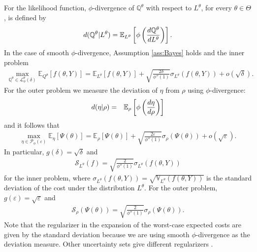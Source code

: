 \documentclass[10pt,a4paper]{amsart}
\numberwithin{equation}{section}
\numberwithin{theorem}{section}
\numberwithin{table}{section}
\numberwithin{figure}{section}
\begin{document}
For the likelihood function,  $\phi$-divergence of ${\mathbb Q}^\theta$ with respect to $L^\theta$, for every $\theta\in{\Theta}$, is defined by
\begin{eqnarray*}
 {\rm d}({\mathbb Q}^\theta|L^\theta)= {\mathbb E}_{L^\theta} \left[\phi \left(\frac{{\rm d}{\mathbb Q}^\theta}{{\rm d} L^\theta}\right) \right].
\end{eqnarray*}
In the case of smooth $\phi$-divergence, Assumption \ref{ass:Bayes} holds and the inner problem \cite{gotoh2026sensitivity} 
\begin{eqnarray*}
\max_{{\mathbb Q}^\theta \in {\mathcal L}^\theta_{\phi}(\delta)} {\mathbb E}_{Q^\theta} [f(\theta, Y)] 
=  {\mathbb E}_{L^\theta}[f(\theta, Y)]  + \sqrt{\frac{2\delta}{\phi''(1)}} {\sigma}_{L^\theta}(f(\theta, Y))+ o(\sqrt{\delta}).
\end{eqnarray*}
For the outer problem we measure the deviation of $\eta$ from $\rho$ using $\phi$-divergence:
\begin{eqnarray*}
{\rm d}( \eta | \rho) & = & {\mathbb E}_\rho \left[\phi\left(\frac{{\rm d}\eta}{{\rm d}\rho}\right)\right]
\end{eqnarray*}
and it follows that
\begin{eqnarray*}
\max_{\eta \in {\mathcal P}_\phi(\varepsilon)} {\mathbb E}_\eta[\Psi(\theta)] 
= {\mathbb E}_\rho[\Psi(\theta)] + \sqrt{\frac{2\varepsilon}{\phi''(1)}}\sigma_\rho(\Psi(\theta)) + o(\sqrt{\varepsilon}).
\end{eqnarray*}
In particular, $g(\delta) = \sqrt{\delta}$ and 
\begin{eqnarray*} 
{\mathcal S}_{L^\theta}(f) =  \sqrt{\frac{2}{\phi''(1)}}  {\sigma}_{L^\theta}(f(\theta, Y))
\end{eqnarray*}  
for the inner problem, where ${\sigma}_{L^\theta}(f(\theta, Y)) = \sqrt{ {\mathbb V}_{L^\theta}(f(\theta, Y))}$ is the standard deviation of the cost under the distribution $L^\theta$. For the outer problem,
$g(\varepsilon) = \sqrt{\varepsilon}$ and
\begin{eqnarray*}
{\mathcal S}_\rho(\Psi(\theta))  =\sqrt{\frac{2}{\phi''(1)}}\sigma_\rho(\Psi(\theta)).
\end{eqnarray*}
Note that the regularizer in the expansion of the worst-case expected costs are given by the standard deviation because we are using smooth $\phi$-divergence as the deviation measure. Other uncertainty sets give different regularizers \cite{gotoh2026sensitivity}.
\end{document}
